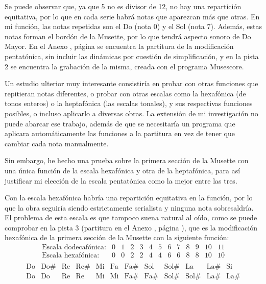    	Se puede observar que, ya que 5 no es divisor de 12, no hay una repartición equitativa, por lo que en cada serie habrá notas que aparezcan más que otras. En mi función, las notas repetidas son el Do (nota 0) y el Sol (nota 7). Además, estas notas forman el bordón de la Musette, por lo que tendrá aspecto sonoro de Do Mayor. En el Anexo , página  se encuentra la partitura de la modificación pentatónica, sin incluir las dinámicas por cuestión de simplificación, y en la pista 2 se encuentra la grabación de la misma, creada con el programa Musescore.
   	
   	Un estudio ulterior muy interesante consistiría en probar con otras funciones que repitieran notas diferentes, o probar con otras escalas como la hexafónica (de tonos enteros) o la heptafónica (las escalas tonales), y sus respectivas funciones posibles, o incluso aplicarlo a diversas obras. La extensión de mi investigación no puede abarcar ese trabajo, además de que se necesitaría un programa que aplicara automáticamente las funciones a la partitura en vez de tener que cambiar cada nota manualmente.
   	
   	Sin embargo, he hecho una prueba sobre la primera sección de la Musette con una única función de la escala hexafónica y otra de la heptafónica, para así justificar mi elección de la escala pentatónica como la mejor entre las tres.
   	
   	Con la escala hexafónica habría una repartición equitativa en la función, por lo que la obra seguiría siendo estrictamente serialista y ninguna nota sobresaldría. El problema de esta escala es que tampoco suena natural al oído, como se puede comprobar en la pista 3 (partitura en el Anexo , página ), que es la modificación hexafónica de la primera sección de la Musette con la siguiente función:
   	$$\left.\begin{matrix}\text{Escala dodecafónica:}&0&1&2&3&4&5&6&7&8&9&10&11\\\text{Escala hexafónica:}&0&0&2&2&4&4&6&6&8&8&10&10\\\end{matrix}\right.$$
   	$$\left.\begin{matrix}\text{Do}&\text{Do\#}&\text{Re}&\text{Re\#}&\text{Mi}&\text{Fa}&\text{Fa\#}&\text{Sol}&\text{Sol\#}&\text{La}&\text{La\#}&\text{Si}\\\text{Do}&\text{Do}&\text{Re}&\text{Re}&\text{Mi}&\text{Mi}&\text{Fa\#}&\text{Fa\#}&\text{Sol\#}&\text{Sol\#}&\text{La\#}&\text{La\#}\\\end{matrix}\right.$$
   	
